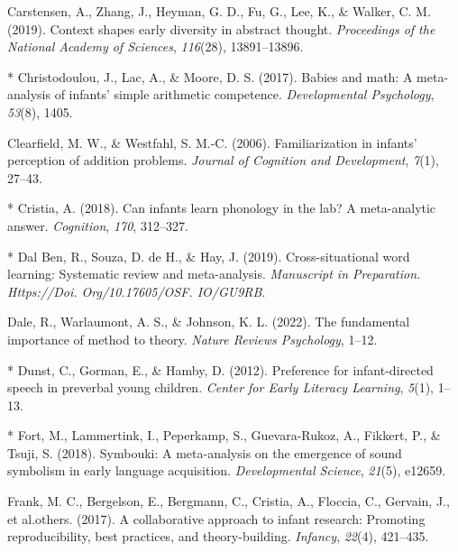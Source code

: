 \documentclass[10pt, letterpaper]{article}
\newenvironment{CSLReferences}%
  {}%
  {\par}
\begin{document}
\begin{CSLReferences}{1}{0}
\leavevmode{}%
Carstensen, A., Zhang, J., Heyman, G. D., Fu, G., Lee, K., \& Walker, C.
M. (2019). Context shapes early diversity in abstract thought.
\emph{Proceedings of the National Academy of Sciences}, \emph{116}(28),
13891--13896.

\leavevmode{}%
* Christodoulou, J., Lac, A., \& Moore, D. S. (2017). Babies and math: A
meta-analysis of infants' simple arithmetic competence.
\emph{Developmental Psychology}, \emph{53}(8), 1405.

\leavevmode{}%
Clearfield, M. W., \& Westfahl, S. M.-C. (2006). Familiarization in
infants' perception of addition problems. \emph{Journal of Cognition and
Development}, \emph{7}(1), 27--43.

\leavevmode{}%
* Cristia, A. (2018). Can infants learn phonology in the lab? A
meta-analytic answer. \emph{Cognition}, \emph{170}, 312--327.

\leavevmode{}%
* Dal Ben, R., Souza, D. de H., \& Hay, J. (2019). Cross-situational
word learning: Systematic review and meta-analysis. \emph{Manuscript in
Preparation. Https://Doi. Org/10.17605/OSF. IO/GU9RB}.

\leavevmode{}%
Dale, R., Warlaumont, A. S., \& Johnson, K. L. (2022). The fundamental
importance of method to theory. \emph{Nature Reviews Psychology}, 1--12.

\leavevmode{}%
* Dunst, C., Gorman, E., \& Hamby, D. (2012). Preference for
infant-directed speech in preverbal young children. \emph{Center for
Early Literacy Learning}, \emph{5}(1), 1--13.

\leavevmode{}%
* Fort, M., Lammertink, I., Peperkamp, S., Guevara-Rukoz, A., Fikkert,
P., \& Tsuji, S. (2018). Symbouki: A meta-analysis on the emergence of
sound symbolism in early language acquisition. \emph{Developmental
Science}, \emph{21}(5), e12659.

\leavevmode{}%
Frank, M. C., Bergelson, E., Bergmann, C., Cristia, A., Floccia, C.,
Gervain, J., et al.others. (2017). A collaborative approach to infant
research: Promoting reproducibility, best practices, and
theory-building. \emph{Infancy}, \emph{22}(4), 421--435.


\end{CSLReferences}
\end{document}
